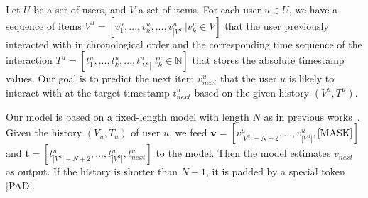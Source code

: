 

Let $U$ be a set of users, and $V$ a set of items. For each user $u\in U$, we have a sequence of items $V^u=[v^u_1, ..., v^u_k, ..., v^u_{|V^u|}|v^u_k\in V]$ that the user previously interacted with in chronological order and the corresponding time sequence of the interaction $T^u=[t^u_1, ..., t^u_k, ..., t^u_{|V^u|}|t^u_k\in \mathbb{N}]$ that stores the absolute timestamp values.
Our goal is to predict the next item $v^u_{next}$ that the user $u$ is likely to interact with at the target timestamp $t^u_{next}$ based on the given history $(V^u, T^u)$. %

\sloppy Our model is based on a fixed-length model with length $N$ as in previous works~\cite{SASRec, BERT4Rec}. Given the history $(V_u, T_u)$ of user $u$, we feed $\mathbf{v} = [v^u_{|V^u|-N+2}, ..., v^u_{|V^u|}, \text{[MASK]}]$ and $\mathbf{t} = [t^u_{|V^u|-N+2}, ..., t^u_{|V^u|}, t^u_{next}]$ to the model. Then the model estimates $v_{next}$ as output. If the history is shorter than $N-1$, it is padded by a special token [PAD]. 
